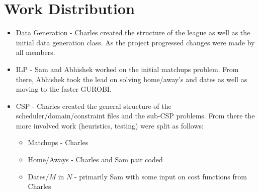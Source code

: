 \documentclass{article}
\begin{document}
	\section{Work Distribution}
	\begin{itemize}
	\item Data Generation - Charles created the structure of the league as well as the initial data generation class. As the project progressed changes were made by all members.
	\item ILP - Sam and Abhishek worked on the initial matchups problem. From there, Abhishek took the lead on solving home/away's and dates as well as moving to the faster GUROBI.
	\item CSP - Charles created the general structure of the scheduler/domain/constraint files and the sub-CSP problems. From there the more involved work (heuristics, testing) were split as follows:
		\begin{itemize}
			\item Matchups - Charles
			\item Home/Aways - Charles and Sam pair coded
			\item Dates/$M$ in $N$ - primarily Sam with some input on cost functions from Charles
		\end{itemize}
	\end{itemize}
\end{document}
